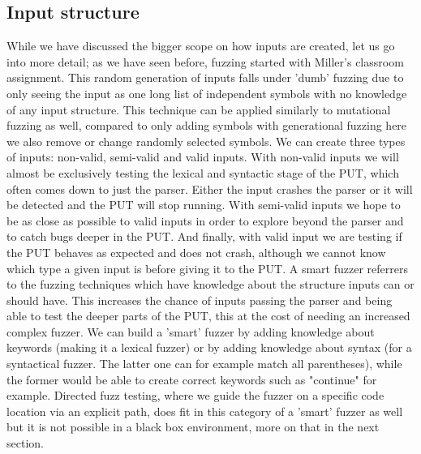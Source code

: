 \subsection{Input structure}
\label{fuzzing:InputStructure}
While we have discussed the bigger scope on how inputs are created, let us go into more detail; as we have seen before, fuzzing started with Miller's classroom assignment. This random generation of inputs falls under 'dumb' fuzzing due to only seeing the input as one long list of independent symbols with no knowledge of any input structure. This technique can be applied similarly to mutational fuzzing as well, compared to only adding symbols with generational fuzzing here we also remove or change randomly selected symbols. 
We can create three types of inputs: non-valid, semi-valid and valid inputs. With non-valid inputs we will almost be exclusively testing the lexical and syntactic stage of the PUT, which often comes down to just the parser. Either the input crashes the parser or it will be detected and the PUT will stop running. With semi-valid inputs we hope to be as close as possible to valid inputs in order to explore beyond the parser and to catch bugs deeper in the PUT. And finally, with valid input we are testing if the PUT behaves as expected and does not crash, although we cannot know which type a given input is before giving it to the PUT.
A smart fuzzer referrers to the fuzzing techniques which have knowledge about the structure inputs can or should have. This increases the chance of inputs passing the parser and being able to test the deeper parts of the PUT, this at the cost of needing an increased complex fuzzer. We can build a 'smart' fuzzer by adding knowledge about keywords (making it a lexical fuzzer) or by adding knowledge about syntax (for a syntactical fuzzer. The latter one can for example match all parentheses), while the former would be able to create correct keywords such as "continue" for example. Directed fuzz testing, where we guide the fuzzer on a specific code location via an explicit path, does fit in this category of a 'smart' fuzzer as well but it is not possible in a black box environment, more on that in the next section.

